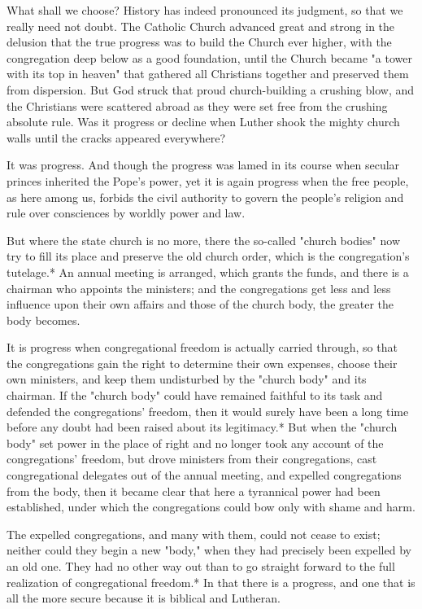 What shall we choose? History has indeed pronounced its judgment, so that we really need not doubt. The Catholic Church advanced great and strong in the delusion that the true progress was to build the Church ever higher, with the congregation deep below as a good foundation, until the Church became "a tower with its top in heaven" that gathered all Christians together and preserved them from dispersion. But God struck that proud church-building a crushing blow, and the Christians were scattered abroad as they were set free from the crushing absolute rule. Was it progress or decline when Luther shook the mighty church walls until the cracks appeared everywhere?

It was progress. And though the progress was lamed in its course when secular princes inherited the Pope’s power, yet it is again progress when the free people, as here among us, forbids the civil authority to govern the people’s religion and rule over consciences by worldly power and law.

But where the state church is no more, there the so-called "church bodies" now try to fill its place and preserve the old church order, which is the congregation’s tutelage.* An annual meeting is arranged, which grants the funds, and there is a chairman who appoints the ministers; and the congregations get less and less influence upon their own affairs and those of the church body, the greater the body becomes.

It is progress when congregational freedom is actually carried through, so that the congregations gain the right to determine their own expenses, choose their own ministers, and keep them undisturbed by the "church body" and its chairman. If the "church body" could have remained faithful to its task and defended the congregations’ freedom, then it would surely have been a long time before any doubt had been raised about its legitimacy.* But when the "church body" set power in the place of right and no longer took any account of the congregations’ freedom, but drove ministers from their congregations, cast congregational delegates out of the annual meeting, and expelled congregations from the body, then it became clear that here a tyrannical power had been established, under which the congregations could bow only with shame and harm.

The expelled congregations, and many with them, could not cease to exist; neither could they begin a new "body," when they had precisely been expelled by an old one. They had no other way out than to go straight forward to the full realization of congregational freedom.* In that there is a progress, and one that is all the more secure because it is biblical and Lutheran. 


